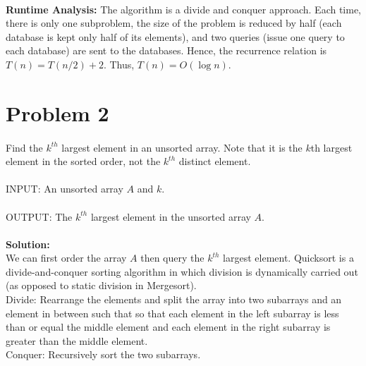 \documentclass[11pt]{article}
\begin{document}
\begin{CJK*}{UTF8}{gkai}
\paragraph{}\textbf{Runtime Analysis:} The algorithm is a divide and conquer approach. Each time, there is only one subproblem, the size of the problem is reduced by half (each database is kept only half of its elements), and two queries (issue one query to each database) are sent to the databases. Hence, the recurrence relation is $T(n) = T(n/2)+2$. Thus, $T(n) = O(\log{n})$.

\section{Problem 2}

\paragraph{}Find the $k^{th}$ largest element in an unsorted array. Note that it is the $k$th largest element in the sorted order, not the $k^{th}$ distinct element.

\paragraph{}INPUT: An unsorted array $A$ and $k$.

\paragraph{}OUTPUT: The $k^{th}$ largest element in the unsorted array $A$.

    \paragraph{}\textbf{Solution:}\\
    We can first order the array $A$ then query the $k^{th}$ largest element.
    Quicksort is a divide-and-conquer sorting algorithm in which division is dynamically carried out (as opposed to static division in Mergesort).\\
    Divide: Rearrange the elements and split the array into two subarrays and an element in between such that so that each element in the left subarray is less than or equal the middle element and each element in the right subarray is greater than the middle element.\\
    Conquer: Recursively sort the two subarrays.



\end{CJK*}
\end{document}
